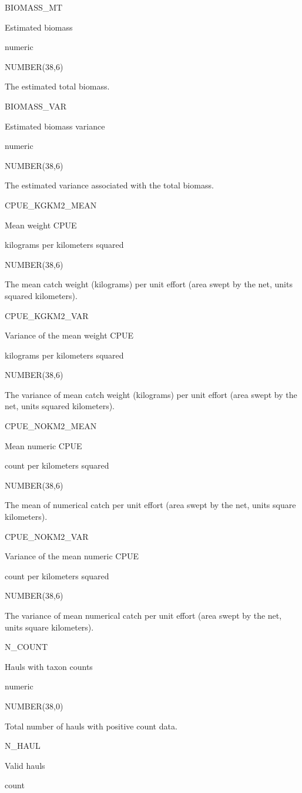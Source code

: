 \documentclass[
  letterpaper,
  oneside,
  open=any]{scrbook}
\begin{document}
BIOMASS\_MT

Estimated biomass

numeric

NUMBER(38,6)

The estimated total biomass.

BIOMASS\_VAR

Estimated biomass variance

numeric

NUMBER(38,6)

The estimated variance associated with the total biomass.

CPUE\_KGKM2\_MEAN

Mean weight CPUE

kilograms per kilometers squared

NUMBER(38,6)

The mean catch weight (kilograms) per unit effort (area swept by the
net, units squared kilometers).

CPUE\_KGKM2\_VAR

Variance of the mean weight CPUE

kilograms per kilometers squared

NUMBER(38,6)

The variance of mean catch weight (kilograms) per unit effort (area
swept by the net, units squared kilometers).

CPUE\_NOKM2\_MEAN

Mean numeric CPUE

count per kilometers squared

NUMBER(38,6)

The mean of numerical catch per unit effort (area swept by the net,
units square kilometers).

CPUE\_NOKM2\_VAR

Variance of the mean numeric CPUE

count per kilometers squared

NUMBER(38,6)

The variance of mean numerical catch per unit effort (area swept by the
net, units square kilometers).

N\_COUNT

Hauls with taxon counts

numeric

NUMBER(38,0)

Total number of hauls with positive count data.

N\_HAUL

Valid hauls

count
\end{document}
